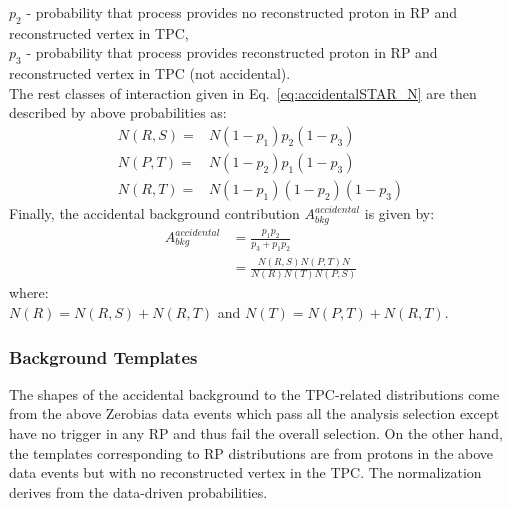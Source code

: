 $p_2$ - probability that process provides no reconstructed proton in RP and  reconstructed vertex in TPC,\\
$p_3$ - probability that process provides reconstructed proton in RP and  reconstructed vertex in TPC (not accidental).\\
\newline\newline
The rest classes of interaction given in Eq.~\ref{eq:accidentalSTAR_N} are then described by  above probabilities as:
\begin{equation}
\begin{split}
N(R,S)=  & N(1-p_1)p_2(1-p_3)\\
N(P,T) = & N(1-p_2)p_1(1-p_3)\\
N(R,T) = & N(1-p_1)(1-p_2)(1-p_3)
\end{split}
\end{equation}
Finally, the accidental background contribution $A_{bkg}^{accidental}$ is  given by:
\begin{equation}
\begin{split}
A_{bkg}^{accidental}&=  \frac{p_1p_2}{p_3+p_1p_2}\\
&=\frac{N(R,S)N(P,T)N}{N(R)N(T)N(P,S)}
\end{split}
\end{equation} 
where:\\
$N(R)=N(R,S)+N(R,T)$ and $N(T)=N(P,T)+N(R,T)$.

\subsubsection{Background Templates}
The shapes of the accidental background to the TPC-related distributions come from the above Zerobias data events which pass all the analysis selection except have no trigger in any RP and  thus fail the overall selection. On the other hand, the templates corresponding to RP distributions are from protons in the above data events but with no reconstructed vertex in the TPC. The normalization derives from the data-driven probabilities.
